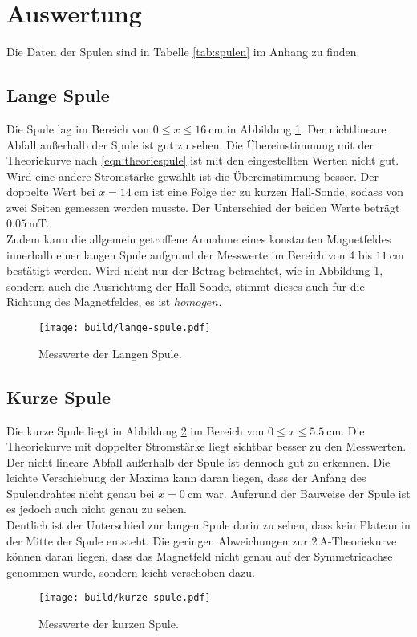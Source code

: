 \section{Auswertung}
\label{sec:Auswertung}
Die Daten der Spulen sind in Tabelle \ref{tab:spulen} im Anhang zu finden.

\subsection{Lange Spule}
Die Spule lag im Bereich von $ 0 \leq x \leq \SI{16}{\centi\metre}$ in Abbildung \ref{fig:lang}.
Der nichtlineare Abfall außerhalb der Spule ist gut zu sehen.
Die Übereinstimmung mit der Theoriekurve nach \ref{eqn:theoriespule}
ist mit den eingestellten Werten nicht gut. Wird eine andere Stromstärke gewählt
ist die Übereinstimmung besser.
Der doppelte Wert bei $x = \SI{14}{\centi\metre}$ ist eine Folge der zu kurzen
Hall-Sonde, sodass von zwei Seiten gemessen werden musste. Der Unterschied der
beiden Werte beträgt $\SI{0.05}{\milli\tesla}$.
\\
Zudem kann die allgemein getroffene Annahme eines konstanten Magnetfeldes innerhalb
einer langen Spule aufgrund der Messwerte im Bereich von 4 bis $\SI{11}{\centi\metre}$
bestätigt werden. Wird nicht nur der Betrag betrachtet, wie in Abbildung \ref{fig:lang},
sondern auch die Ausrichtung der Hall-Sonde, stimmt dieses auch für die Richtung des Magnetfeldes,
es ist $homogen$.
\begin{figure}
      \centering
      \texttt{[image: build/lange-spule.pdf]}
      \caption{Messwerte der Langen Spule.}
      \label{fig:lang}
\end{figure}

\subsection{Kurze Spule}
Die kurze Spule liegt in Abbildung \ref{fig:kurz} im Bereich von $0 \leq x \leq \SI{5.5}{\centi\metre}$.
Die Theoriekurve mit doppelter Stromstärke liegt sichtbar besser zu den Messwerten.
Der nicht lineare Abfall außerhalb der Spule ist dennoch gut zu erkennen.
Die leichte Verschiebung der Maxima kann daran liegen, dass der Anfang des Spulendrahtes
nicht genau bei $x = \SI{0}{\centi\metre}$ war. Aufgrund der Bauweise der Spule
ist es jedoch auch nicht genau zu sehen.
\\
Deutlich ist der Unterschied zur langen Spule darin zu sehen, dass kein Plateau in der Mitte
der Spule entsteht.
Die geringen Abweichungen zur $\SI{2}{\ampere}$-Theoriekurve können daran liegen,
dass das Magnetfeld nicht genau auf der Symmetrieachse genommen wurde,
sondern leicht verschoben dazu.
\begin{figure}
      \centering
      \texttt{[image: build/kurze-spule.pdf]}
      \caption{Messwerte der kurzen Spule.}
      \label{fig:kurz}
\end{figure}

